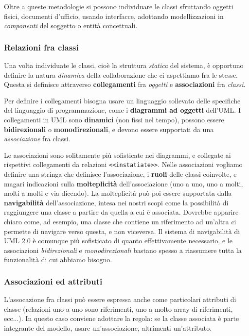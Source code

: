 \documentclass[a4paper,11pt]{article}
\begin{document}
Oltre a queste metodologie si possono individuare le classi sfruttando oggetti fisici, documenti d'ufficio, usando interfacce, adottando modellizzazioni in \textit{componenti} del soggetto o entità concettuali.

\subsubsection{Relazioni fra classi}
Una volta individuate le classi, cioè la struttura \textit{statica} del sistema, è opportuno definire la natura \textit{dinamica} della collaborazione che ci aspettiamo fra le stesse.
Questa si definisce attraverso \textbf{collegamenti} fra \textit{oggetti} e \textbf{associazioni} fra \textit{classi}.

Per definire i collegamenti bisogna usare un linguaggio sollevato delle specifiche del linguaggio di programmazione, come i \textbf{diagrammi ad oggetti} dell'UML.
I collegamenti in UML sono \textbf{dinamici} (non fissi nel tempo), possono essere \textbf{bidirezionali} o \textbf{monodirezionali}, e devono essere supportati da una \textit{associazione} fra classi.

Le associazioni sono solitamente più sofisticate nei diagrammi, e collegate ai rispettivi collegamenti da relazioni \lstinline|<<instatiate>>|. Nelle associazioni vogliamo definire una stringa che definisce l'associazione, i \textbf{ruoli} delle classi coinvolte, e magari indicazioni sulla \textbf{molteplicità} dell'associazione (uno a uno, uno a molti, molti a molti e via dicendo).
La molteplicità può poi essere supportata dalla \textbf{navigabilità} dell'associazione, intesa nei nostri scopi come la possibilità di raggiungere una classe a partire da quella a cui è associata.
Dovrebbe apparire chiaro come, ad esempio, una classe che contiene un riferimento ad un'altra ci permette di navigare verso questa, e non viceversa.
Il sistema di navigabilità di UML 2.0 è comunque più sofisticato di quanto effettivamente necessario, e le associazioni \textit{bidirezionali} e \textit{monodirezionali} bastano spesso a riassumere tutta la funzionalità di cui abbiamo bisogno.

\subsubsection{Associazioni ed attributi}
L'assocazione fra classi può essere espressa anche come particolari attributi di classe (relazioni uno a uno sono riferimenti, uno a molto array di riferimenti, ecc...).
In questo caso conviene adottare la regola: se la classe associata è parte integrante del modello, usare un'associazione, altrimenti un'attributo.
\end{document}
